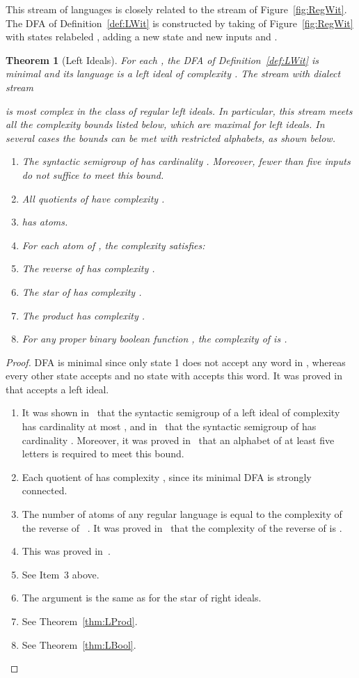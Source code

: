 \documentclass[final]{dmtcs-episciences}
\newcommand{\be}{\begin{enumerate}}
\newcommand{\ee}{\end{enumerate}}
\newtheorem{theorem}{Theorem}
\theoremstyle{definition}
\theoremstyle{remark}
\begin{document}
This stream of languages is closely related to the stream of Figure~\ref{fig:RegWit}.
The DFA  of Definition~\ref{def:LWit} is constructed by taking  of Figure~\ref{fig:RegWit} with states relabeled , adding a new state  and new inputs  and . 
 


\begin{theorem}[Left Ideals]
For each , the DFA  of Definition~\ref{def:LWit} is minimal and its 
language  is a left ideal of complexity .
The stream   with dialect stream

is most complex in the class of regular left ideals.
In particular, this stream meets all the complexity bounds listed below, which are maximal for left ideals. In several cases the bounds can be met with restricted alphabets, as shown below.
\be
\item
The syntactic semigroup of  has cardinality .  Moreover, fewer than five inputs do not suffice to meet this bound.
\item
All quotients of  have complexity .
\item
 has  atoms. 
\item
For each atom  of , the complexity  satisfies:

\item
The reverse of  has complexity .

\item
The star of  has complexity .
\item
The product  has complexity .
\item
For any proper binary boolean function , the complexity of  
is .

\ee
\end{theorem}
\begin{proof}
DFA  is minimal  since 
only state 1 does not accept any word in , whereas every other state  accepts  and no state  with   accepts this word.
It was proved in~\cite{BrYe11} that   accepts a left ideal.
\be
\item
It was shown in~\cite{BrSz14} that the syntactic semigroup of a left ideal of complexity  has cardinality at most , and
in~\cite{BrYe11} that the syntactic semigroup of  has cardinality . 
Moreover, it was proved in~\cite{BSY15} that an alphabet of at least five letters is required to meet this bound. 
\item
Each quotient of  has complexity , since its minimal DFA is strongly connected.
\item
The number of atoms of any regular language  is equal to the complexity of the reverse of ~\cite{BrTa13}. It was proved in~\cite{BrYe11} that the complexity of the reverse of  is .
\item
This was proved in~\cite{BrDa15}.
\item
See Item~3 above.
\item
The argument is the same as for the star of right ideals.
\item
See Theorem~\ref{thm:LProd}.
\item
See Theorem~\ref{thm:LBool}.
\ee
\end{proof}
\end{document}

